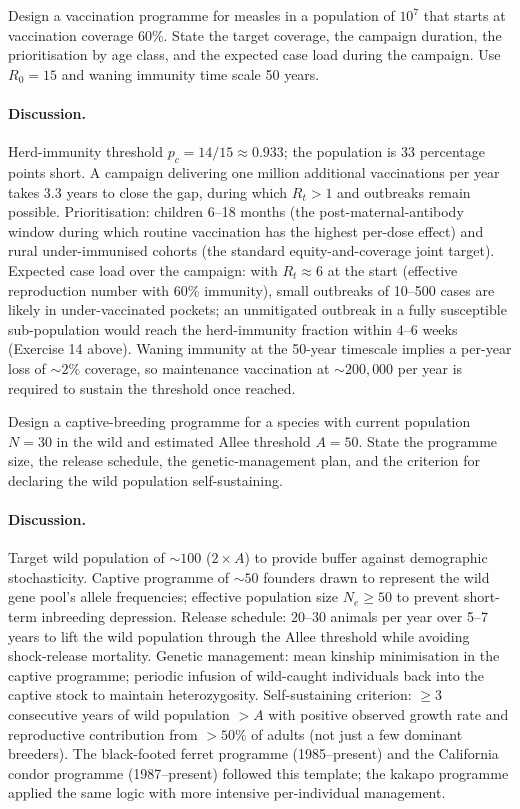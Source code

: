 \begin{exercise}
Design a vaccination programme for measles in a population of
$10^7$ that starts at vaccination coverage 60\%. State the
target coverage, the campaign duration, the prioritisation by age
class, and the expected case load during the campaign. Use $R_0 =
15$ and waning immunity time scale 50 years.

\paragraph{Discussion.} Herd-immunity threshold $p_c = 14/15
\approx 0.933$; the population is 33 percentage points short. A
campaign delivering one million additional vaccinations per year
takes 3.3 years to close the gap, during which $R_t > 1$ and
outbreaks remain possible. Prioritisation: children 6--18 months
(the post-maternal-antibody window during which routine
vaccination has the highest per-dose effect) and rural
under-immunised cohorts (the standard equity-and-coverage joint
target). Expected case load over the campaign: with $R_t \approx
6$ at the start (effective reproduction number with 60\%
immunity), small outbreaks of 10--500 cases are likely in
under-vaccinated pockets; an unmitigated outbreak in a fully
susceptible sub-population would reach the herd-immunity fraction
within 4--6 weeks (Exercise 14 above). Waning immunity at the
50-year timescale implies a per-year loss of $\sim 2\%$ coverage,
so maintenance vaccination at $\sim 200{,}000$ per year is
required to sustain the threshold once reached.
\end{exercise}

\begin{exercise}
Design a captive-breeding programme for a species with current
population $N = 30$ in the wild and estimated Allee threshold
$A = 50$. State the programme size, the release schedule, the
genetic-management plan, and the criterion for declaring the wild
population self-sustaining.

\paragraph{Discussion.} Target wild population of $\sim 100$
($2 \times A$) to provide buffer against demographic stochasticity.
Captive programme of $\sim 50$ founders drawn to represent the
wild gene pool's allele frequencies; effective population size
$N_e \geq 50$ to prevent short-term inbreeding depression.
Release schedule: $20$--$30$ animals per year over 5--7 years to
lift the wild population through the Allee threshold while
avoiding shock-release mortality. Genetic management: mean
kinship minimisation in the captive programme; periodic
infusion of wild-caught individuals back into the captive stock
to maintain heterozygosity. Self-sustaining criterion: $\geq 3$
consecutive years of wild population $> A$ with positive observed
growth rate and reproductive contribution from $> 50\%$ of adults
(not just a few dominant breeders). The black-footed ferret
programme (1985--present) and the California condor programme
(1987--present) followed this template; the kakapo programme
applied the same logic with more intensive per-individual
management.
\end{exercise}

